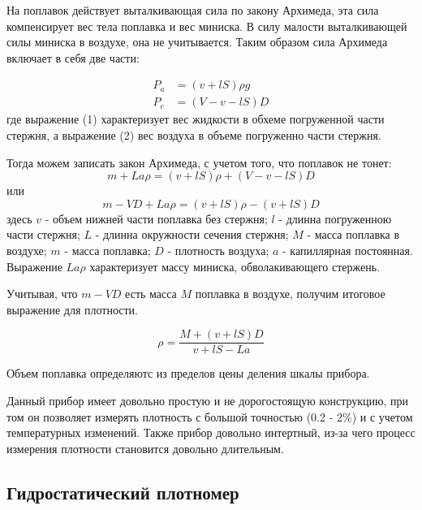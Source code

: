 \documentclass[russian, utf8, 12pt]{eskdtext}
\begin{document}
\newpage

На поплавок действует выталкивающая сила по закону Архимеда, эта сила компенсирует вес тела поплавка и вес миниска. В силу малости выталкивающей силы миниска в воздухе, она не учитывается. Таким образом сила Архимеда включает в себя две части:

\begin{align}
	P_a & = (v + lS)\rho g \\
	P_c & = (V - v - lS)D
\end{align}
где выражение (1) характеризует вес жидкости в обхеме погруженной части стержня, а выражение (2) вес воздуха в объеме погруженно части стержня. \par

Тогда можем записать закон Архимеда, с учетом того, что поплавок не тонет: 
\begin{equation}
	m + La\rho = (v + lS)\rho + (V - v - lS)D
\end{equation}
или
\begin{equation}
	m - VD + La\rho = (v + lS)\rho - (v + lS)D
\end{equation}
здесь $v$ - объем нижней части поплавка без стержня; $l$ - длинна погруженною части стержня; $L$ - длинна окружности сечения стержня; $M$ - масса поплавка в воздухе; $m$ - масса поплавка; $D$ - плотность воздуха; $a$ - капиллярная постоянная. Выражение $La\rho$ характеризует массу миниска, обволакивающего стержень. \par 

Учитывая, что $m - VD$ есть масса $M$ поплавка в воздухе, получим итоговое выражение для плотности.

\begin{equation}
	\rho = \frac{M + (v + lS)D}{v + lS - La}
\end{equation}

Объем поплавка определяютс из пределов цены деления шкалы прибора. \par

Данный прибор имеет довольно простую и не дорогостоящую конструкцию, при том он позволяет измерять плотность с большой точностью (0.2 - 2\%) и с учетом температурных изменений. Также прибор довольно интертный, из-за чего процесс измерения плотности становится довольно длительным. 

\newpage

\subsection{Гидростатический плотномер}
\end{document}

